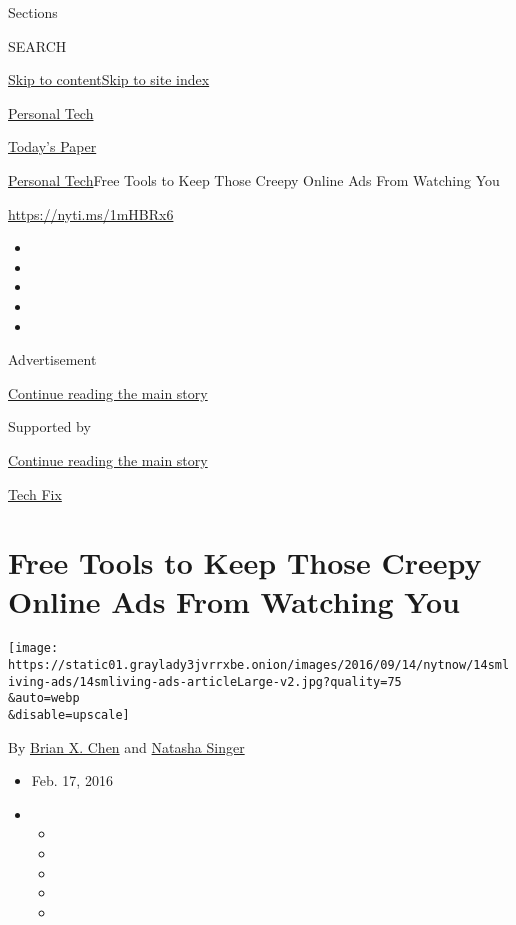 Sections

SEARCH

\protect\hyperlink{site-content}{Skip to
content}\protect\hyperlink{site-index}{Skip to site index}

\href{https://www.nytimes3xbfgragh.onion/section/technology/personaltech}{Personal
Tech}

\href{https://myaccount.nytimes3xbfgragh.onion/auth/login?response_type=cookie\&client_id=vi}{}

\href{https://www.nytimes3xbfgragh.onion/section/todayspaper}{Today's
Paper}

\href{/section/technology/personaltech}{Personal Tech}\textbar{}Free
Tools to Keep Those Creepy Online Ads From Watching You

\href{https://nyti.ms/1mHBRx6}{https://nyti.ms/1mHBRx6}

\begin{itemize}
\item
\item
\item
\item
\item
\end{itemize}

Advertisement

\protect\hyperlink{after-top}{Continue reading the main story}

Supported by

\protect\hyperlink{after-sponsor}{Continue reading the main story}

\href{/column/tech-fix}{Tech Fix}

\hypertarget{free-tools-to-keep-those-creepy-online-ads-from-watching-you}{%
\section{Free Tools to Keep Those Creepy Online Ads From Watching
You}\label{free-tools-to-keep-those-creepy-online-ads-from-watching-you}}

\texttt{[image: https://static01.graylady3jvrrxbe.onion/images/2016/09/14/nytnow/14smliving-ads/14smliving-ads-articleLarge-v2.jpg?quality=75\\\&auto=webp\\\&disable=upscale]}

By \href{http://www.nytimes3xbfgragh.onion/by/brian-x-chen}{Brian X.
Chen} and
\href{http://www.nytimes3xbfgragh.onion/by/natasha-singer}{Natasha
Singer}

\begin{itemize}
\item
  Feb. 17, 2016
\item
  \begin{itemize}
  \item
  \item
  \item
  \item
  \item
  \end{itemize}
\end{itemize}


